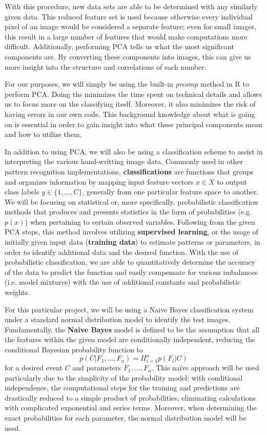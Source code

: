 \documentclass[twocolumn]{article}
\begin{document}
With this procedure, new data sets are able to be determined with any similarly given data. This reduced feature set is used because otherwise every individual pixel of an image would be considered a separate feature; even for small images, this result in a large number of features that would make computations more difficult. Additionally, performing PCA tells us what the most significant components are. By converting these components into images, this can give us more insight into the structure and correlations of each number.

For our purposes, we will simply be using the built-in \emph{prcomp} method in R to perform PCA. Doing ths minimizes the time spent on technical details and allows us to focus more on the classifying itself. Moreover, it also minimizes the risk of having errors in our own code. This background knowledge about what is going on is essential in order to gain insight into what these principal components mean and how to utilize them.

In addition to using PCA, we will also be using a classification scheme to assist in interpreting the various hand-writting image data. Commonly used in other pattern recognition implementations, \textbf{classifications} are functions that groups and organizes information by mapping input feature vectors $x \in X$ to output class labels $y \in \{1,\ldots, C\}$, generally from one particular feature space to another. We will be focusing on statistical or, more specifically, probabilistic classification methods that produces and presents statistics in the form of probabilities (e.g. $p(x)$) when pertaining to certain observed variables. Following from the given PCA steps, this method involves utilizing \textbf{supervised learning}, or the usage of initially given input data (\textbf{training data}) to estimate patterns or parameters, in order to identify additional data and the desired function. With the use of probabilistic classification, we are able to quantitatively determine the accuracy of the data to predict the function and easily compensate for various imbalances (i.e. model mixtures) with the use of additional constants and probabilistic weights.

For this particular project, we will be using a Naive Bayes classification system under a standard normal distribution model to identify the test images. Fundamentally, the \textbf{Naive Bayes} model is defined to be the assumption that all the features within the given model are conditionally independent, reducing the conditional Bayesian probability function to
$$p(C | F_1,\ldots, F_n) = \Pi_{i=1}^{n}p(F_i | C)$$
for a desired event $C$ and parameters $F_1,\ldots, F_n$. This naïve approach will be used particularly due to the simplicity of the probability model; with conditional independence, the computational steps for the training and predictions are drastically reduced to a simple product of probabilities, eliminating calculations with complicated exponential and series terms. Moreover, when determining the exact probabilities for each parameter, the normal distribution model will be used.
\end{document}
